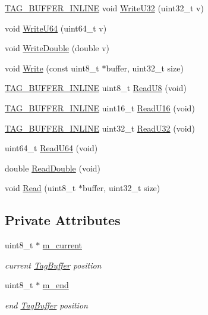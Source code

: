 \begin{DoxyCompactItemize}
\item 
\hyperlink{tag-buffer_8h_a8e389298c53aa29f5ba6ee36ab9c8057}{T\+A\+G\+\_\+\+B\+U\+F\+F\+E\+R\+\_\+\+I\+N\+L\+I\+NE} void \hyperlink{classns3_1_1TagBuffer_abbb5049f106100a61e38db498132121d}{Write\+U32} (uint32\+\_\+t v)
\item 
void \hyperlink{classns3_1_1TagBuffer_a07e5c5faad7bc7127780af120928799d}{Write\+U64} (uint64\+\_\+t v)
\item 
void \hyperlink{classns3_1_1TagBuffer_a46ebfa31e9c68dea82ced96cd10200dc}{Write\+Double} (double v)
\item 
void \hyperlink{classns3_1_1TagBuffer_adfddfcd8996e2426cb03c9220f715b49}{Write} (const uint8\+\_\+t $\ast$buffer, uint32\+\_\+t size)
\item 
\hyperlink{tag-buffer_8h_a8e389298c53aa29f5ba6ee36ab9c8057}{T\+A\+G\+\_\+\+B\+U\+F\+F\+E\+R\+\_\+\+I\+N\+L\+I\+NE} uint8\+\_\+t \hyperlink{classns3_1_1TagBuffer_af424ec7219aed6d9d31d414bf89ae5bd}{Read\+U8} (void)
\item 
\hyperlink{tag-buffer_8h_a8e389298c53aa29f5ba6ee36ab9c8057}{T\+A\+G\+\_\+\+B\+U\+F\+F\+E\+R\+\_\+\+I\+N\+L\+I\+NE} uint16\+\_\+t \hyperlink{classns3_1_1TagBuffer_a2dae8685da35b22191117b513218bfa6}{Read\+U16} (void)
\item 
\hyperlink{tag-buffer_8h_a8e389298c53aa29f5ba6ee36ab9c8057}{T\+A\+G\+\_\+\+B\+U\+F\+F\+E\+R\+\_\+\+I\+N\+L\+I\+NE} uint32\+\_\+t \hyperlink{classns3_1_1TagBuffer_a6b1c1414efc7cf8ea6a3f682c3e27663}{Read\+U32} (void)
\item 
uint64\+\_\+t \hyperlink{classns3_1_1TagBuffer_acfe6a8fddc8eec86949ab991fd801bbe}{Read\+U64} (void)
\item 
double \hyperlink{classns3_1_1TagBuffer_a984f1c4c4e6d44564f4794d6a641169f}{Read\+Double} (void)
\item 
void \hyperlink{classns3_1_1TagBuffer_a1da2fae250eb24650a5e0169d9bf1997}{Read} (uint8\+\_\+t $\ast$buffer, uint32\+\_\+t size)
\end{DoxyCompactItemize}
\subsection*{Private Attributes}
\begin{DoxyCompactItemize}
\item 
uint8\+\_\+t $\ast$ \hyperlink{classns3_1_1TagBuffer_ad03f753ebf3582e552474f2a185504ea}{m\+\_\+current}
\begin{DoxyCompactList}\small\item\em current \hyperlink{classns3_1_1TagBuffer}{Tag\+Buffer} position \end{DoxyCompactList}\item 
uint8\+\_\+t $\ast$ \hyperlink{classns3_1_1TagBuffer_ad68c99370c0cfb1337dfba17ae8ffecf}{m\+\_\+end}
\begin{DoxyCompactList}\small\item\em end \hyperlink{classns3_1_1TagBuffer}{Tag\+Buffer} position \end{DoxyCompactList}\end{DoxyCompactItemize}


